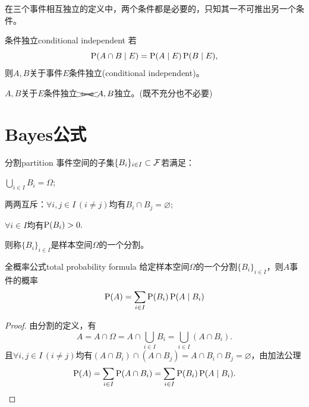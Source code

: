 \begin{remark}
	在三个事件相互独立的定义中，两个条件都是必要的，只知其一不可推出另一个条件。
\end{remark}


\begin{definition}{条件独立}{conditional independent}
	若
	\begin{equation}\label{eq:ps-conditional-independence}
		\P(A \cap B \mid E) = \P(A \mid E)\P(B \mid E),
	\end{equation}
	则$A,B$关于事件$E$条件独立(conditional independent)。
\end{definition}

\begin{remark}
	$A,B$关于$E$条件独立$\xcancel{\iff}A,B$独立。(既不充分也不必要)
\end{remark}

\section{Bayes公式}

\begin{definition}
	{分割}{partition}
	事件空间的子集$\{B_i\}_{i\in I} \subset \eventspace$若满足：
	\begin{compactenum}
		\item $\textstyle\bigcup_{i\in I} B_i = \Omega;$
		\item 两两互斥：$\forall i,j \in I\,(i \neq j)$均有$B_i \cap B_j = \varnothing;$
		\item $\forall i \in I$均有$\P(B_i) > 0.$
	\end{compactenum}
	则称$\{B_i\}_{i\in I}$是样本空间$\Omega$的一个分割。
\end{definition}

\begin{theorem}{全概率公式}{total probability formula}
	给定样本空间$\Omega$的一个分割$\{B_i\}_{i\in I}$，则$A$事件的概率
	\begin{equation}
		\P(A) = \sum_{i\in I}\P(B_i)\P(A \mid B_i)
	\end{equation}
\end{theorem}

\begin{proof}
	由分割的定义，有
	\[
		A = A \cap \Omega = A \cap \bigcup_{i\in I}B_i = \bigcup_{i\in I}(A \cap B_i).
	\]
	且$\forall i,j \in I\,(i \neq j)$均有$(A \cap B_i) \cap (A \cap B_j) = A \cap B_i \cap B_j = \varnothing$，由加法公理
	\[
		\P(A) = \sum_{i\in I}\P(A \cap B_i) = \sum_{i\in I}\P(B_i)\P(A \mid B_i).
		\qedhere
	\]
\end{proof}

